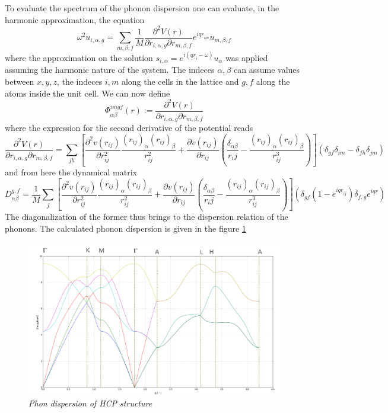 \documentclass[a4paper]{article}
\begin{document}
    To evaluate the spectrum of the phonon dispersion one can evaluate, in the harmonic approximation, the equation 
    \begin{equation}
        \omega^2 u_{i,\alpha, g} = \sum_{m,\beta,f} \frac{1}{M}\frac{\partial^2 V(r)}{\partial r_{i,\alpha, g}\partial r_{m,\beta,f}}e^{i\underline{q}\underline{r}_{im}}u_{m,\beta, f}
    \end{equation}
    where the approximation on the solution $s_{i,\alpha}=e^{i(\underline{q}\underline{r}_i - \omega)}u_{\alpha}$ was applied assuming the harmonic nature of the system.
    The indeces $\alpha,\beta$ can assume values between $x,y,z$, the indeces $i,m$ along the cells in the lattice and $g,f$ along the atoms inside the unit cell.
    We can now define 
    \begin{equation}
        \Phi_{\alpha\beta}^{imgf}(r):=\frac{\partial^2 V(r)}{\partial r_{i,\alpha,g}\partial r_{m,\beta,f}}
    \end{equation}
    where the expression for the second derivative of the potential reads
    \begin{equation*}
        \frac{\partial^2 V(r)}{\partial r_{i,\alpha,g}\partial r_{m,\beta,f}} = \sum_{jh}\left[\frac{\partial^2 v(r_{ij})}{\partial r_{ij}^2}\frac{(r_{ij})_{\alpha}(r_{ij})_{\beta}}{r_{ij}^2} + \frac{\partial v(r_{ij})}{\partial r_{ij}}\left(\frac{\delta_{\alpha\beta}}{r_ij}-\frac{(r_{ij})_{\alpha}(r_{ij})_{\beta}}{r_{ij}^3}\right)\right](\delta_{gf}\delta_{im}-\delta_{fh}\delta_{jm})
    \end{equation*}
    and from here the dynamical matrix
    \begin{equation}
        D_{\alpha\beta}^{g,f} = \frac{1}{M}\sum_j\left[\frac{\partial^2 v(r_{ij})}{\partial r_{ij}^2}\frac{(r_{ij})_{\alpha}(r_{ij})_{\beta}}{r_{ij}^2} + \frac{\partial v(r_{ij})}{\partial r_{ij}}\left(\frac{\delta_{\alpha\beta}}{r_ij}-\frac{(r_{ij})_{\alpha}(r_{ij})_{\beta}}{r_{ij}^3}\right)\right]\left(\delta_{gf}(1-e^{i\underline{q}\underline{r}_{ij}}) \bar{\delta}_{f,g}e^{i\underline{q}\underline{r}}\right)
    \end{equation}
    The diagonalization of the former thus brings to the dispersion relation of the phonons. The calculated phonon dispersion is given in the figure \ref{phonon-hcp}
    \begin{figure}[h]
        \centering
        \includegraphics[width=12cm]{phonon_hcp.png}
        \caption{\it \label{phonon-hcp}Phon dispersion of HCP structure}
    \end{figure}
\end{document}
